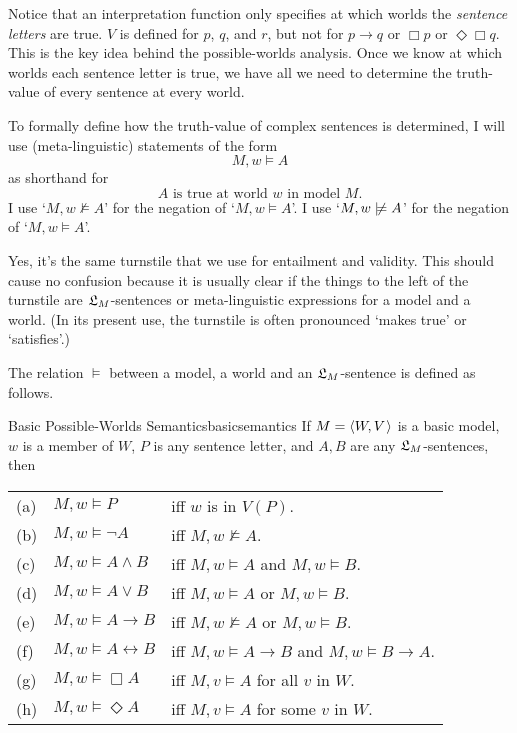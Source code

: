 Notice that an interpretation function only specifies at which worlds the
\emph{sentence letters} are true. $V$ is defined for $p$, $q$, and $r$, but not
for $p \to q$ or $\Box p$ or $\Diamond \Box q$. This is the key idea behind the
possible-worlds analysis. Once we know at which worlds each sentence letter is
true, we have all we need to determine the truth-value of every sentence at
every world.

To formally define how the truth-value of complex sentences is determined, I
will use (meta-linguistic) statements of the form
\[
  M,w \models A
\]
%
as shorthand for
%
\[
  \text{$A$ is true at world $w$ in model $M$}.
\]
I use `$M,w \not\models A$' for the negation of `$M,w \models A$'.
I use `$M,w \notmodels A$' for the negation of `$M,w \models A$'.

Yes, it's the same turnstile that we use for entailment and validity. This
should cause no confusion because it is usually clear if the things to the left
of the turnstile are $\mathfrak{L}_M$-sentences or meta-linguistic expressions for a model
and a world. (In its present use, the turnstile is often pronounced `makes true'
or `satisfies'.)

The relation $\models$ between a model, a world and an $\mathfrak{L}_M$-sentence is
defined as follows.

\begin{definition}{Basic Possible-Worlds Semantics}{basicsemantics}
  If $M = \t{W,V}$ is a basic model, $w$ is a member of $W$, $P$ is
  any sentence letter, and $A,B$ are any $\mathfrak{L}_M$-sentences, then

  \medskip
  \begin{tabular}{lll}
    (a) & $M,w \models P$ &iff $w$ is in $V(P)$.\\
    (b) & $M,w \models \neg A$ &iff $M,w \not\models A$.\\
    (c) & $M,w \models A \land B$ &iff $M,w \models A$ and $M,w \models B$.\\
    (d) & $M,w \models A \lor B$ &iff $M,w \models A$ or $M,w \models B$.\\
    (e) & $M,w \models A \to B$ &iff $M,w \not\models A$ or $M,w \models B$.\\
    (f) & $M,w \models A \leftrightarrow B$ &iff $M,w \models A\to B$ and $M,w \models B\to A$.\\
    (g) & $M,w \models \Box A$ &iff $M,v \models A$ for all $v$ in $W$.\\
    (h) & $M,w \models \Diamond A$ &iff $M,v \models A$ for some $v$ in $W$.
  \end{tabular}
\end{definition}

